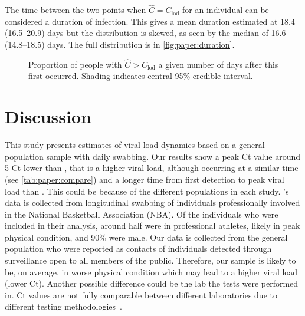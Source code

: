 \documentclass[thesis.tex]{subfiles}
\begin{document}
The time between the two points when $\hat{C} = C_\text{lod}$ for an individual can be considered a duration of infection.
This gives a mean duration estimated at 18.4 (16.5--20.9) days but the distribution is skewed, as seen by the median of 16.6 (14.8--18.5) days.
The full distribution is in \autoref{fig:paper:duration}.
\begin{figure}
    \centering
    \caption{Proportion of people with $\hat{C} > C_\text{lod}$ a given number of days after this first occurred. Shading indicates central 95\% credible interval.}
    \label{fig:paper:duration}
\end{figure}

\section{Discussion}

This study presents estimates of viral load dynamics based on a general population sample with daily swabbing.
Our results show a peak Ct value around 5 Ct lower than \textcite{kisslerViral}, that is a higher viral load, although occurring at a similar time (see \autoref{tab:paper:compare}) and a longer time from first detection to peak viral load than \textcite{jonesEstimating}.
This could be because of the different populations in each study. \Textcite{kisslerViral}'s data is collected from longitudinal swabbing of individuals professionally involved in the National Basketball Association (NBA).
Of the individuals who were included in their analysis, around half were in professional athletes, likely in peak physical condition, and 90\% were male.
Our data is collected from the general population who were reported as contacts of individuals detected through surveillance open to all members of the public.
Therefore, our sample is likely to be, on average, in worse physical condition which may lead to a higher viral load (lower Ct).
Another possible difference could be the lab the tests were performed in.
Ct values are not fully comparable between different laboratories due to different testing methodologies~\autocites{dahdouhCt,hanRTPCR}.
\end{document}
